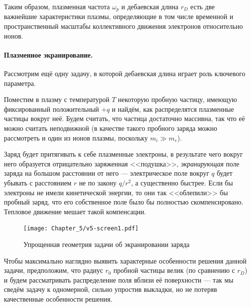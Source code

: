 Таким образом, плазменная частота $\omega_p$ и дебаевская длина $r_D$
есть две важнейшие характеристики плазмы, определяющие в том числе
временной и пространственный масштабы коллективного движения электронов
относительно ионов.


\paragraph{Плазменное экранирование.}
Рассмотрим ещё одну задачу, в которой дебаевская длина играет роль
ключевого параметра.

Поместим в плазму с температурой $T$ некоторую пробную частицу, имеющую фиксированный
положительный $+q$ и найдём, как распределятся плазменные частицы вокруг неё.
Будем считать, что частица достаточно массивна, так что её можно
считать неподвижной (в качестве такого пробного заряда можно рассмотреть
и один из ионов плазмы, поскольку $m_i \gg m_e$).

Заряд будет притягивать к себе плазменные электроны, в результате чего
вокруг него образуется отрицательно заряженная <<подушка>>,
\emph{экранирующая} поле заряда на большом расстоянии от него ---
электрическое поле вокруг $q$ будет убывать с расстоянием $r$
не по закону $q/r^2$, а существенно быстрее.
Если бы электроны не имели кинетической энергии, то они так <<облепили>>
бы пробный заряд, что его собственное поле было бы полностью скомпенсировано.
Тепловое движение мешает такой компенсации.

\begin{figure}
\centering\texttt{[image: Chapter\_5/v5-screen1.pdf]}
\caption{Упрощенная геометрия задачи об экранировании заряда}
\end{figure}

Чтобы максимально наглядно выявить характерные особенности решения данной задачи,
предположим, что радиус $r_0$ пробной частицы велик (по сравнению с $r_D$)
и будем рассматривать распределение поля вблизи её поверхности ---
так мы сведём задачу к одномерной, сильно упростив выкладки, но не потеряв
качественные особенности решения.

